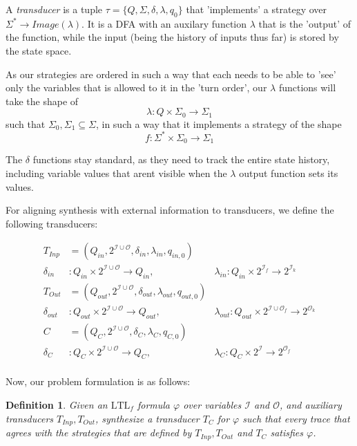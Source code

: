 \documentclass{article}
\newtheorem{definition}{Definition}
\newcommand{\Ifree}{\mathcal{I}_{f}}
\newcommand{\Iknown}{\mathcal{I}_{k}}
\newcommand{\Ofree}{\mathcal{O}_{f}}
\newcommand{\Oknown}{\mathcal{O}_{k}}
\newcommand{\Tin}{T_{\mathit{Inp}}}
\newcommand{\Tout}{T_{\mathit{Out}}}
\begin{document}
A \emph{transducer} is a tuple $\tau=\{Q,\Sigma,\delta,\lambda,q_0\}$ that 'implements' a strategy over $\Sigma^* \to Image(\lambda)$. It is a DFA with an auxilary function $\lambda$ that is the 'output' of the function, while the input (being the history of inputs thus far) is stored by the state space.

As our strategies are ordered in such a way that each needs to be able to 'see' only the variables that is allowed to it in the 'turn order', our $\lambda$ functions will take the shape of $$\lambda: Q \times \Sigma_{0} \to \Sigma_{1}$$ such that $\Sigma_{0}, \Sigma_{1} \subseteq \Sigma$, in such a way that it implements a strategy of the shape $$f: \Sigma^* \times \Sigma_{0} \to \Sigma_{1}$$

The $\delta$ functions stay standard, as they need to track the entire state history, including variable values that arent visible when the $\lambda$ output function sets its values.

\pagebreak

For aligning synthesis with external information to transducers, we define the following transducers: 

\begin{align*}
    \Tin &= (Q_{in}, 2^{\mathcal{I} \cup \mathcal{O}}, \delta_{in}, \lambda_{in}, q_{in, 0}) \\
    \delta_{in} &: Q_{in} \times 2^{\mathcal{I} \cup \mathcal{O}} \to Q_{in} , &
    \lambda_{in} : Q_{in} \times 2^{\Ifree} \to 2^{\Iknown} \\
    \Tout &= (Q_{out}, 2^{\mathcal{I} \cup \mathcal{O}}, \delta_{out}, \lambda_{out}, q_{out, 0}) \\
    \delta_{out} &: Q_{out} \times 2^{\mathcal{I} \cup \mathcal{O}} \to Q_{out} , &
    \lambda_{out} : Q_{out} \times 2^{\mathcal{I}\cup \Ofree} \to 2^{\Oknown} \\
    C &= (Q_{C}, 2^{\mathcal{I} \cup \mathcal{O}}, \delta_{C}, \lambda_{C}, q_{C, 0}) \\
    \delta_{C} &: Q_{C} \times 2^{\mathcal{I} \cup \mathcal{O}} \to Q_{C} , &
    \lambda_{C} : Q_{C} \times 2^{\mathcal{I}} \to 2^{\Ofree} \\
\end{align*}

Now, our problem formulation is as follows:
\begin{definition}\label{def:probDefTransducer}
    Given an $\text{LTL}_f$ formula $\varphi$ over variables $\mathcal{I}$ and $\mathcal{O}$, and auxiliary transducers  $\Tin, \Tout$, synthesize a transducer $T_C$ for $\varphi$ such that every trace that agrees with the strategies that are defined by $\Tin, \Tout$ and $T_C$ satisfies $\varphi$.
\end{definition}
\end{document}
